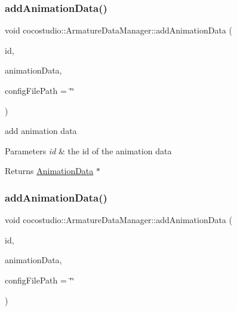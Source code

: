 \subsubsection{\texorpdfstring{add\+Animation\+Data()}{addAnimationData()}\hspace{0.1cm}{\footnotesize\ttfamily [1/2]}}
{\footnotesize\ttfamily void cocostudio\+::\+Armature\+Data\+Manager\+::add\+Animation\+Data (\begin{DoxyParamCaption}\item[{const std\+::string \&}]{id,  }\item[{\hyperlink{classcocostudio_1_1AnimationData}{Animation\+Data} $\ast$}]{animation\+Data,  }\item[{const std\+::string \&}]{config\+File\+Path = {\ttfamily \char`\"{}\char`\"{}} }\end{DoxyParamCaption})}



add animation data 


\begin{DoxyParams}{Parameters}
{\em id} & the id of the animation data \\
\hline
\end{DoxyParams}
\begin{DoxyReturn}{Returns}
\hyperlink{classcocostudio_1_1AnimationData}{Animation\+Data} $\ast$ 
\end{DoxyReturn}
\mbox{\label{classcocostudio_1_1ArmatureDataManager_a36a1eb7cdc144ce7ee0a17bcc3f5726d}} 
\subsubsection{\texorpdfstring{add\+Animation\+Data()}{addAnimationData()}\hspace{0.1cm}{\footnotesize\ttfamily [2/2]}}
{\footnotesize\ttfamily void cocostudio\+::\+Armature\+Data\+Manager\+::add\+Animation\+Data (\begin{DoxyParamCaption}\item[{const std\+::string \&}]{id,  }\item[{\hyperlink{classcocostudio_1_1AnimationData}{Animation\+Data} $\ast$}]{animation\+Data,  }\item[{const std\+::string \&}]{config\+File\+Path = {\ttfamily \char`\"{}\char`\"{}} }\end{DoxyParamCaption})}



